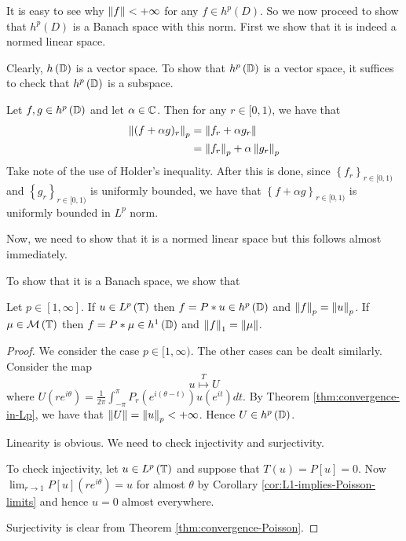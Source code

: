 It is easy to see why $\left\lVert f \right\rVert < +\infty$ for any $f\in h^{p} \left( D \right)$. So we now proceed to show that $h^{p} \left( D \right)$ is a Banach space with this norm. First we show that it is indeed a normed linear space.

Clearly, $h \left( \mathbb D \right)$ is a vector space. To show that $h^{p} \left( \mathbb D \right)$ is a vector space, it suffices to check that $h^{p} \left( \mathbb D \right)$ is a subspace.

Let $f,g \in h^{p} \left( \mathbb D \right)$ and let $\alpha \in \mathbb C$. Then for any $r\in [0,1)$, we have that 
\begin{align*}
    \left\lVert (f+\alpha g)_{r} \right\rVert_{p} &= \left\lVert f_{r} + \alpha g_{r} \right\rVert \\
    &= \left\lVert f_{r} \right\rVert_{p} + \alpha \left\lVert g_{r} \right\rVert_{p}
\end{align*}
Take note of the use of Holder's inequality. After this is done, since $\left\{ f_{r} \right\}_{r\in [0,1)}$ and $\left\{ g_{r} \right\}_{r\in [0,1)}$ is uniformly bounded, we have that $\left\{ f+ \alpha g \right\}_{r\in [0,1)}$ is uniformly bounded in $L^{p}$ norm.

Now, we need to show that it is a normed linear space but this follows almost immediately.

To show that it is a Banach space, we show that

\begin{theorem}
    Let $p\in [1, \infty]$. If $u\in L^{p} \left( \mathbb T \right)$ then $f=P * u \in h^{p} \left( \mathbb D \right)$ and $\left\lVert f \right\rVert_{p} =\left\lVert u \right\rVert_{p}$. If $\mu \in {\cal M} \left( \mathbb T \right)$ then $f= P * \mu \in h^{1} \left( \mathbb D \right)$ and $\left\lVert f \right\rVert_{1} = \left\lVert \mu \right\rVert$.
    \label{thm:lp-and-hp}
\end{theorem}
\begin{proof}
    We consider the case $p \in [1, \infty )$. The other cases can be dealt similarly. Consider the map 
    \begin{equation*}
	u \stackrel{T}{\mapsto} U
    \end{equation*}
    where $U\left( re^{i\theta} \right) = \frac{1}{2\pi} \int_{-\pi}^{\pi} P_{r}\left( e^{i(\theta-t)} \right) u \left( e^{it} \right) dt$. By Theorem \ref{thm:convergence-in-Lp}, we have that $\left\lVert U \right\rVert = \left\lVert u \right\rVert_{p} < +\infty$. Hence $U \in h^{p} \left( \mathbb D \right)$.

    Linearity is obvious. We need to check injectivity and surjectivity.

    To check injectivity, let $u \in L^{p} \left( \mathbb T \right)$ and suppose that $T(u)=P[u]=0$. Now $\lim_{r\to 1} P[u] \left( re^{i\theta} \right) = u$ for almost $\theta$ by Corollary \ref{cor:L1-implies-Poisson-limits} and hence $u=0$ almost everywhere.

    Surjectivity is clear from Theorem \ref{thm:convergence-Poisson}.
    \end{proof}

